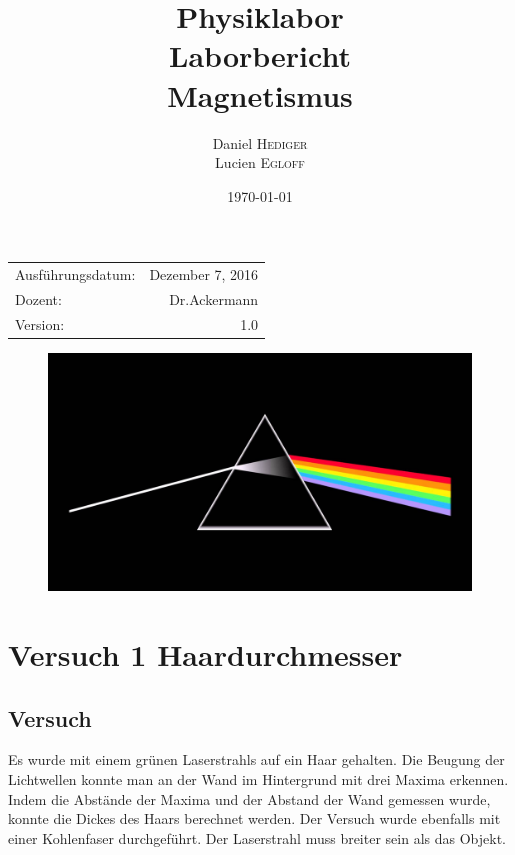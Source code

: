 \documentclass{article}
\title{Physiklabor \\ Laborbericht \\ Magnetismus} %
\author{Daniel \textsc{Hediger} \\ Lucien \textsc{Egloff}} %
\date{\today} %
\begin{document}
\maketitle %

\begin{center}
\begin{tabular}{l r}
	Ausführungsdatum: & Dezember 7, 2016 \\ %
	Dozent: & Dr.Ackermann \\%
	Version: & 1.0
	
\end{tabular}
\end{center}
\begin{figure}[H]
	\centering
	\includegraphics[scale=0.2]{dsotm.jpg} 
\end{figure}
\newpage
\tableofcontents 

\newpage
\section{Versuch 1 Haardurchmesser}
\subsection{Versuch}
Es wurde mit einem grünen Laserstrahls auf ein Haar gehalten. Die Beugung der Lichtwellen konnte
man an der Wand im Hintergrund mit drei Maxima erkennen. Indem die Abstände der Maxima und
der Abstand der Wand gemessen wurde, konnte die Dickes des Haars berechnet werden. Der Versuch
wurde ebenfalls mit einer Kohlenfaser durchgeführt. Der Laserstrahl muss breiter sein als das
Objekt.
\end{document}
